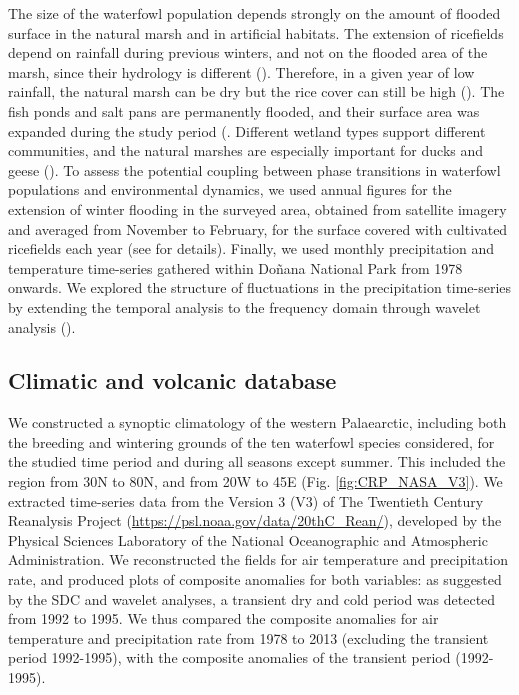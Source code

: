 \documentclass[12pt]{article}
\begin{document}
The size of the waterfowl population depends strongly on the amount of flooded surface in the natural marsh and in artificial habitats. The extension of ricefields depend on rainfall during previous winters, and not on the flooded area of the marsh, since their hydrology is different (\cite{Green2018}). Therefore, in a given year of low rainfall, the natural marsh can be dry but the rice cover can still be high (\cite{Ramo2013,VanRees2021}). The fish ponds and salt pans are permanently flooded, and their surface area was expanded during the study period (\cite{Rendon2008,Walton2015}. Different wetland types support different communities, and the natural marshes are especially important for ducks and geese (\cite{Rendon2008,Sebastian-Gonzalez2016}). To assess the potential coupling between phase transitions in waterfowl populations and environmental dynamics, we used annual figures for the extension of winter flooding in the surveyed area, obtained from satellite imagery and averaged from November to February, for the surface covered with cultivated ricefields each year (see \cite{Almaraz2012} for details). Finally, we used monthly precipitation and temperature time-series gathered within Doñana National Park from 1978 onwards. We explored the structure of fluctuations in the precipitation time-series by extending the temporal analysis to the frequency domain through wavelet analysis (\cite{Torrence1998,Cazelles2008}).\\

\subsection*{Climatic and volcanic database}
\label{subsec:Climatic and volcanic database}

We constructed a synoptic climatology of the western Palaearctic, including both the breeding and wintering grounds of the ten waterfowl species considered, for the studied time period and during all seasons except summer. This included the region from 30N to 80N, and from 20W to 45E (Fig. \ref{fig:CRP_NASA_V3}). We extracted time-series data from the Version 3 (V3) of The Twentieth Century Reanalysis Project (\url{https://psl.noaa.gov/data/20thC_Rean/}), developed by the Physical Sciences Laboratory of the National Oceanographic and Atmospheric Administration. We reconstructed the fields for air temperature and precipitation rate, and produced plots of composite anomalies for both variables: as suggested by the SDC and wavelet analyses, a transient dry and cold period was detected from 1992 to 1995. We thus compared the composite anomalies for air temperature and precipitation rate from 1978 to 2013 (excluding the transient period 1992-1995), with the composite anomalies of the transient period (1992-1995).\\
\end{document}
